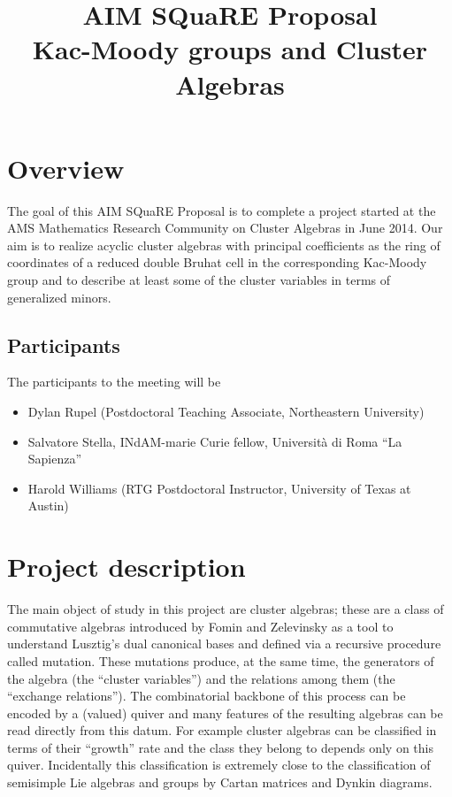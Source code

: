 \documentclass{amsart}
\title[\small{Kac-Moody groups and Cluster Algebras}]
  {AIM SQuaRE Proposal\\ 
  \small{Kac-Moody groups and Cluster Algebras}}
\begin{document}
  \maketitle
  
  \section*{Overview}
    The goal of this AIM SQuaRE Proposal is to complete a project started at the AMS Mathematics Research Community on Cluster Algebras in June 2014.
    Our aim is to realize acyclic cluster algebras with principal coefficients as the ring of coordinates of a reduced double Bruhat cell in the corresponding Kac-Moody group and to describe at least some of the cluster variables in terms of generalized minors.
    
  \subsection*{Participants}
    The participants to the meeting will be 
    \begin{itemize}
      \item Dylan Rupel (Postdoctoral Teaching Associate, Northeastern University)
      \item Salvatore Stella, INdAM-marie Curie fellow, Università di Roma ``La Sapienza''
      \item Harold Williams (RTG Postdoctoral Instructor, University of Texas at Austin) 
    \end{itemize}
  
  \section*{Project description}

  The main object of study in this project are cluster algebras; these are a class of commutative algebras introduced by Fomin and Zelevinsky as a tool to understand Lusztig's dual canonical bases and  defined via a recursive procedure called mutation. 
  These mutations produce, at the same time, the generators of the algebra (the ``cluster variables'') and the relations among them (the ``exchange relations'').
  The combinatorial backbone of this process can be encoded by a (valued) quiver and many features of the resulting algebras can be read directly from this datum.
  For example cluster algebras can be classified in terms of their ``growth'' rate and the class they belong to depends only on this quiver.
  Incidentally this classification is extremely close to the classification of semisimple Lie algebras and groups by Cartan matrices and Dynkin diagrams. 
\end{document}
